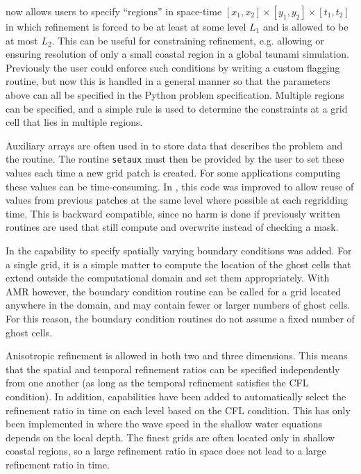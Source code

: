 \amrclaw now allows users to specify ``regions'' in space-time
$[x_1,x_2] \times [y_1,y_2] \times [t_1,t_2]$ in which refinement is forced to
be at least at some level $L_1$ and is allowed to be at most $L_2$.  This can be
useful for constraining refinement, e.g. allowing or ensuring resolution of only
a small coastal region in a global tsunami simulation. Previously the user could
enforce such conditions by writing a custom flagging routine, but now this is
handled in a general manner so that the parameters above can all be specified in
the Python problem specification. Multiple regions can be specified, and a
simple rule is used to determine the constraints at a grid cell that lies in
multiple regions.

Auxiliary arrays are often used in \clawpack to store data that
describes the problem and the routine.
The routine \texttt{setaux} must then be provided by the user to set these values each time a
new grid patch is created.  For some applications computing these values can be time-consuming.  In ,
this code was improved to allow reuse of values from previous patches at
the same level where possible at each regridding time.
This is backward compatible, since no harm is done if previously
written routines are used that still compute and overwrite instead of
checking a mask.

In  the capability to specify spatially varying boundary
conditions was added. For a single grid, it is a simple matter to
compute the location of the ghost cells that extend outside the
computational domain and set them appropriately.  With AMR however,
the boundary condition routine can be called for a grid located
anywhere in the domain, and may contain fewer or larger numbers of
ghost cells. For this reason, the boundary condition routines
 do not assume a fixed number of ghost cells.

Anisotropic refinement is allowed in both two and three dimensions.
This means that the spatial and temporal refinement ratios can be
specified independently from one another (as long as the temporal
refinement satisfies the CFL condition).  In addition, capabilities
have been added to automatically select the refinement ratio in time  on each
level based on the CFL condition.  This has only been implemented in
\geoclaw where the wave speed in the shallow water equations
depends on the local depth. The finest grids are often located only in
shallow coastal regions, so a large refinement ratio in space does not
lead to a large refinement ratio in time.

